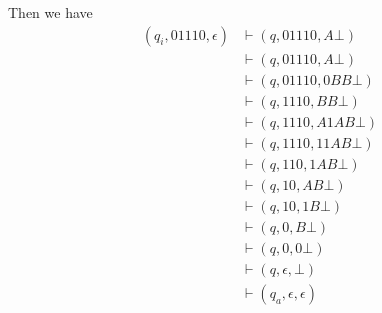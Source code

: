 \documentclass[a4paper]{article}
\newcommand{\changesto}{\vdash}
\begin{document}
\begin{eg}
    Then we have
    \begin{align*}
        (q_i, 01110, \epsilon) &\changesto (q, 01110, A\bot)\\
                               &\changesto (q, 01110, A\bot)\\
                               &\changesto (q, 01110, 0BB\bot)\\
                               &\changesto (q, 1110, BB\bot)\\
                               &\changesto (q, 1110, A1AB\bot)\\
                               &\changesto (q, 1110, 11AB\bot)\\
                               &\changesto (q, 110, 1AB\bot)\\
                               &\changesto (q, 10, AB\bot)\\
                               &\changesto (q, 10, 1B\bot)\\
                               &\changesto (q, 0, B\bot)\\
                               &\changesto (q, 0, 0\bot)\\
                               &\changesto (q, \epsilon, \bot)\\
                               &\changesto (q_a, \epsilon, \epsilon)
    \end{align*}
\end{eg}
\end{document}
